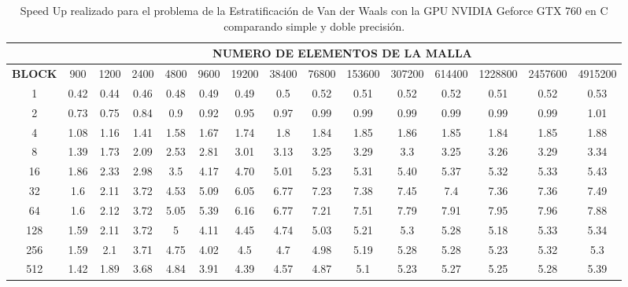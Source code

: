 \begin{table}[]
    \begin{tabular}{|c|c|c|c|c|c|c|c|c|c|c|c|c|c|c|}
    \hline
                   & \multicolumn{14}{c|}{\textbf{NUMERO DE ELEMENTOS DE LA MALLA}}                                                    \\ \hline
    \textbf{BLOCK} & 900  & 1200 & 2400 & 4800 & 9600 & 19200 & 38400 & 76800 & 153600 & 307200 & 614400 & 1228800 & 2457600 & 4915200 \\ \hline
    1              & 0.42 & 0.44 & 0.46 & 0.48 & 0.49 & 0.49  & 0.5   & 0.52  & 0.51   & 0.52   & 0.52   & 0.51    & 0.52    & 0.53    \\ \hline
    2              & 0.73 & 0.75 & 0.84 & 0.9  & 0.92 & 0.95  & 0.97  & 0.99  & 0.99   & 0.99   & 0.99   & 0.99    & 0.99    & 1.01    \\ \hline
    4              & 1.08 & 1.16 & 1.41 & 1.58 & 1.67 & 1.74  & 1.8   & 1.84  & 1.85   & 1.86   & 1.85   & 1.84    & 1.85    & 1.88    \\ \hline
    8              & 1.39 & 1.73 & 2.09 & 2.53 & 2.81 & 3.01  & 3.13  & 3.25  & 3.29   & 3.3    & 3.25   & 3.26    & 3.29    & 3.34    \\ \hline
    16             & 1.86 & 2.33 & 2.98 & 3.5  & 4.17 & 4.70  & 5.01  & 5.23  & 5.31   & 5.40   & 5.37   & 5.32    & 5.33    & 5.43    \\ \hline
    32             & 1.6  & 2.11 & 3.72 & 4.53 & 5.09 & 6.05  & 6.77  & 7.23  & 7.38   & 7.45   & 7.4    & 7.36    & 7.36    & 7.49    \\ \hline
    64             & 1.6  & 2.12 & 3.72 & 5.05 & 5.39 & 6.16  & 6.77  & 7.21  & 7.51   & 7.79   & 7.91   & 7.95    & 7.96    & 7.88    \\ \hline
    128            & 1.59 & 2.11 & 3.72 & 5    & 4.11 & 4.45  & 4.74  & 5.03  & 5.21   & 5.3    & 5.28   & 5.18    & 5.33    & 5.34    \\ \hline
    256            & 1.59 & 2.1  & 3.71 & 4.75 & 4.02 & 4.5   & 4.7   & 4.98  & 5.19   & 5.28   & 5.28   & 5.23    & 5.32    & 5.3     \\ \hline
    512            & 1.42 & 1.89 & 3.68 & 4.84 & 3.91 & 4.39  & 4.57  & 4.87  & 5.1    & 5.23   & 5.27   & 5.25    & 5.28    & 5.39    \\ \hline
    \end{tabular}
    \caption{Speed Up realizado para el problema de la Estratificación de Van der Waals con la GPU NVIDIA Geforce GTX 760 en C comparando simple y doble precisión.}
    \label{tab:c_760_VdW_cuda_10}
    \end{table}